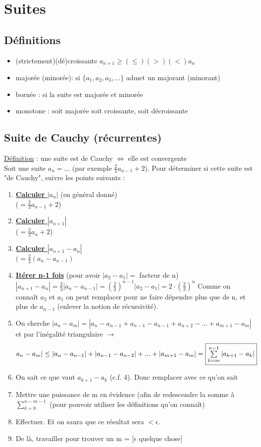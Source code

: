 \documentclass[12pt,a4paper]{article}
\newcommand{\somme}[2]{\ensuremath{\sum\limits_{#2}^{#1}}}
\newcommand{\evid}[1]{\textbf{\underline{#1}}}
\newcommand{\Definition}{\underline{Définition} }
\begin{document}
\section{Suites}
\subsection{Définitions}
\begin{itemize}
	\item (strictement)(dé)croissante $a_{n+1} \geq (\leq)(>)(<) a_n$
	\item majorée (minorée): si $\{a_1,a_2,a_3,...\}$ admet un majorant (minorant)
	\item bornée : si la suite est majorée et minorée
	\item monotone : soit majorée soit croissante, soit décroissante
\end{itemize}
\subsection{Suite de Cauchy (récurrentes)}
\Definition : une suite est de Cauchy $\iff$ elle est convergente\\
Soit une suite $a_n = \ldots $ (par exemple $\frac{2}{3}a_{n-1} +2$). Pour déterminer si cette suite est "de Cauchy", suivre les points suivants :\\
\begin{enumerate}
	\item \evid{Calculer $|a_n|$} (en général donné)\\
		($= \frac{2}{3}a_{n-1} + 2$)
	\item \evid{Calculer $|a_{n+1}|$} \\
		($=\frac{2}{3}a_n + 2$)
	\item \evid{Calculer $|a_{n+1}-a_n|$}\\
		$(=\frac{2}{3}(a_n-a_{n-1})$
	\item \evid{Itérer n-1 fois} (pour avoir $|a_2-a_1| =$ facteur de n)\\
	$|a_{n+1}-a_n| = \frac{2}{3}|a_n-a_{n-1}|  = \left(\frac{2}{3}\right)^{n-1}|a_2-a_1| = 2\cdot\left(\frac{2}{3}\right)^n $ Comme on connaît $a_2$ et $a_1$ on peut remplacer pour ne faire dépendre plus que de n, et plus de $a_{n-1}$ (enlever la notion de récursivité).
	\item On cherche $|a_n -a_m| = |a_n - a_{n-1} + a_{n-1} - a_{n-1} + a_{n+2}-...+a_{m+1}-a_m|$ et par l'inégalité triangulaire $\to$
	\begin{equation*}
		a_n-a_m| \leq |a_n -a_{n-1}| + |a_{n-1} - a_{n-2}|+...+|a_{m+1}-a_m| = \fbox{$\somme{n-1}{k=m} |a_{k+1}-a_k|$}
	\end{equation*}
	\item On sait ce que vaut $a_{k+1}-a_k$ (c.f. 4). Donc remplacer avec ce qu'on sait
	\item Mettre une puissance de m en évidence (afin de redescendre la somme à \somme{n-m-1}{k=0} (pour pouvoir utiliser les définitions qu'on connaît)
	\item Effectuer. Et on saura que ce résultat sera $< \epsilon$.
	\item De là, travailler pour trouver un m = [$\epsilon$ quelque chose] 
\end{enumerate}
\end{document}
